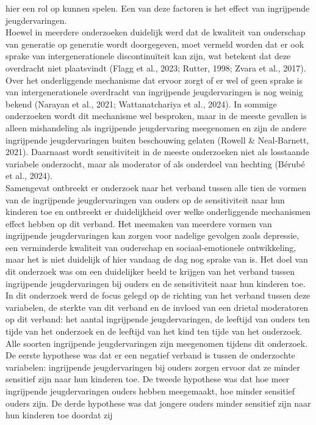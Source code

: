 \documentclass[12pt]{article}
\begin{document}
hier een rol op kunnen spelen. Een van deze factoren is het effect van
ingrijpende jeugdervaringen.\\
Hoewel in meerdere onderzoeken duidelijk werd dat de kwaliteit van
ouderschap van generatie op generatie wordt doorgegeven, moet vermeld
worden dat er ook sprake van intergenerationele discontinuïteit kan
zijn, wat betekent dat deze overdracht niet plaatsvindt (Flagg et al.,
2023; Rutter, 1998; Zvara et al., 2017). Over het onderliggende
mechanisme dat ervoor zorgt of er wel of geen sprake is van
intergenerationele overdracht van ingrijpende jeugdervaringen is nog
weinig bekend (Narayan et al., 2021; Wattanatchariya et al., 2024). In
sommige onderzoeken wordt dit mechanisme wel besproken, maar in de
meeste gevallen is alleen mishandeling als ingrijpende jeugdervaring
meegenomen en zijn de andere ingrijpende jeugdervaringen buiten
beschouwing gelaten (Rowell \& Neal‐Barnett, 2021). Daarnaast wordt
sensitiviteit in de meeste onderzoeken niet als losstaande variabele
onderzocht, maar als moderator of als onderdeel van hechting (Bérubé et
al., 2024).\\
Samengevat ontbreekt er onderzoek naar het verband tussen alle tien de
vormen van de ingrijpende jeugdervaringen van ouders op de sensitiviteit
naar hun kinderen toe en ontbreekt er duidelijkheid over welke
onderliggende mechanismen effect hebben op dit verband. Het meemaken van
meerdere vormen van ingrijpende jeugdervaringen kan zorgen voor nadelige
gevolgen zoals depressie, een verminderde kwaliteit van ouderschap en
sociaal-emotionele ontwikkeling, maar het is niet duidelijk of hier
vandaag de dag nog sprake van is. Het doel van dit onderzoek was om een
duidelijker beeld te krijgen van het verband tussen ingrijpende
jeugdervaringen bij ouders en de sensitiviteit naar hun kinderen toe. In
dit onderzoek werd de focus gelegd op de richting van het verband tussen
deze variabelen, de sterkte van dit verband en de invloed van een
drietal moderatoren op dit verband: het aantal ingrijpende
jeugdervaringen, de leeftijd van ouders ten tijde van het onderzoek en
de leeftijd van het kind ten tijde van het onderzoek. Alle soorten
ingrijpende jeugdervaringen zijn meegenomen tijdens dit onderzoek. De
eerste hypothese was dat er een negatief verband is tussen de
onderzochte variabelen: ingrijpende jeugdervaringen bij ouders zorgen
ervoor dat ze minder sensitief zijn naar hun kinderen toe. De tweede
hypothese was dat hoe meer ingrijpende jeugdervaringen ouders hebben
meegemaakt, hoe minder sensitief ouders zijn. De derde hypothese was dat
jongere ouders minder sensitief zijn naar hun kinderen toe doordat zij
\end{document}
